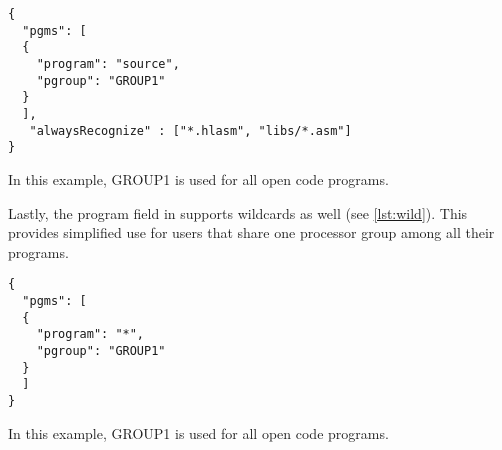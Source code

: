 \begin{listing}
	\begin{verbatim}
{
  "pgms": [
  {
    "program": "source",
    "pgroup": "GROUP1"
  }
  ],
   "alwaysRecognize" : ["*.hlasm", "libs/*.asm"]
}
	\end{verbatim}
	\caption{In this example, GROUP1 is used for all open code programs.}
	\label{lst:alw}
\end{listing}

Lastly, the program field in  supports wildcards as well (see \cref{lst:wild}). This provides simplified use for users that share one processor group among all their programs.

\begin{listing}
	\begin{verbatim}
{
  "pgms": [
  {
    "program": "*",
    "pgroup": "GROUP1"  
  }
  ]
}
	\end{verbatim}
	\caption{In this example, GROUP1 is used for all open code programs.}
	\label{lst:wild}
\end{listing}
